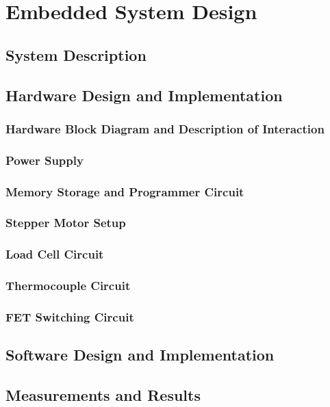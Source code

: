 \chapter{Embedded System Design}

\section{System Description}

\section{Hardware Design and Implementation}
\subsection{Hardware Block Diagram and Description of Interaction}
\subsection{Power Supply}
\subsection{Memory Storage and Programmer Circuit}
\subsection{Stepper Motor Setup}
\subsection{Load Cell Circuit}
\subsection{Thermocouple Circuit}
\subsection{FET Switching Circuit}

\section{Software Design and Implementation}

\section{Measurements and Results}


